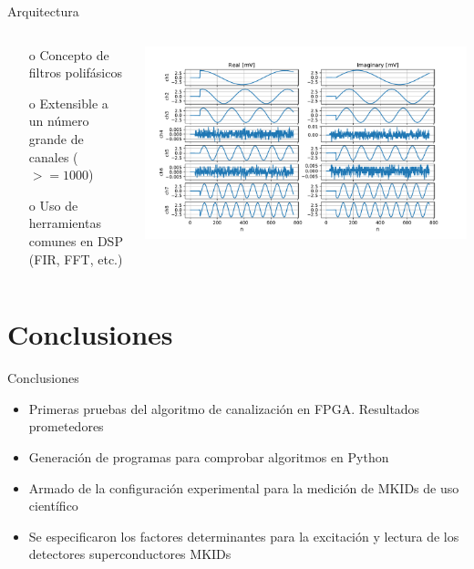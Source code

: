 \documentclass[ignorenonframetext,12pt]{beamer}
\begin{document}
				\begin{frame}{Arquitectura}
								\begin{columns}
												\begin{column}{0.4\textwidth}
																\begin{itemize}
																				\item[o] Concepto de filtros polifásicos
																				\item[o] Extensible a un n\'umero grande de canales ($>=1000$)
																				\item[o] Uso de herramientas comunes en DSP (FIR, FFT, etc.)
																\end{itemize}
												\end{column}
												\begin{column}{0.6\textwidth}
																\includegraphics[width=\textwidth]{gd_chann16_out_1_8}
												\end{column}
								\end{columns}
				\end{frame}

\section{Conclusiones}
\begin{frame}{Conclusiones}
				\begin{itemize}
								\item Primeras pruebas del algoritmo de canalización en FPGA.
												Resultados prometedores
								\item Generación de programas para comprobar algoritmos en Python
								\item Armado de la configuración experimental para la medición
												de MKIDs de uso científico
								\item Se especificaron los factores determinantes para la
												excitación y lectura de los detectores superconductores MKIDs
				\end{itemize}
\end{frame}
\end{document}
